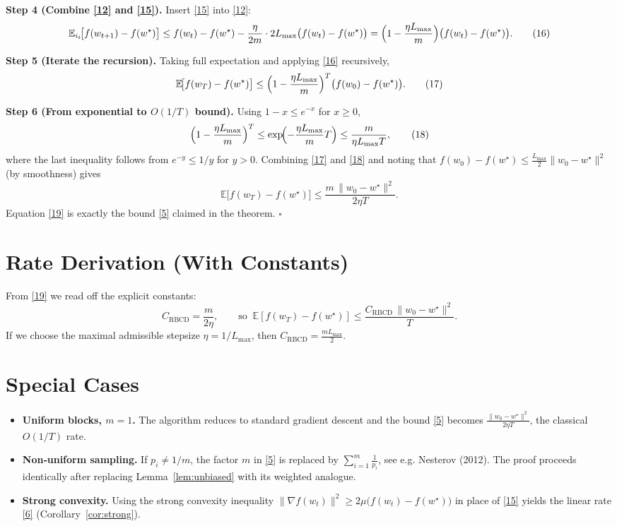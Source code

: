 \documentclass{article}
\newcommand{\E}{\mathbb{E}}
\begin{document}
\noindent\textbf{Step 4 (Combine \eqref{12} and \eqref{15}).}  
Insert \eqref{15} into \eqref{12}:
\[
\E_{i_t}\!\bigl[f(w_{t+1})-f(w^{\star})\bigr]
\le f(w_t)-f(w^{\star})-\frac{\eta}{2m}\cdot
2L_{\max}\bigl(f(w_t)-f(w^{\star})\bigr)
= \Bigl(1-\frac{\eta L_{\max}}{m}\Bigr)
\bigl(f(w_t)-f(w^{\star})\bigr).
\tag{16}
\]

\noindent\textbf{Step 5 (Iterate the recursion).}  
Taking full expectation and applying \eqref{16} recursively,
\[
\E\!\bigl[f(w_T)-f(w^{\star})\bigr]
\le \Bigl(1-\frac{\eta L_{\max}}{m}\Bigr)^{T}
\bigl(f(w_0)-f(w^{\star})\bigr).
\tag{17}
\]

\noindent\textbf{Step 6 (From exponential to $O(1/T)$ bound).}  
Using $1-x\le e^{-x}$ for $x\ge0$,
\[
\Bigl(1-\frac{\eta L_{\max}}{m}\Bigr)^{T}
\le \exp\!\Bigl(-\frac{\eta L_{\max}}{m}T\Bigr)
\le \frac{m}{\eta L_{\max}T},
\tag{18}
\]
where the last inequality follows from $e^{-y}\le 1/y$ for $y>0$.
Combining \eqref{17} and \eqref{18} and noting that
$f(w_0)-f(w^{\star})\le \frac{L_{\max}}{2}\|w_0-w^{\star}\|^{2}$
(by smoothness) gives
\[
\E\!\bigl[f(w_T)-f(w^{\star})\bigr]
\le \frac{m\,\|w_0-w^{\star}\|^{2}}{2\eta T}.
\tag{19}
\]
Equation \eqref{19} is exactly the bound \eqref{5} claimed in the theorem.
\hfill $\square$

\section*{Rate Derivation (With Constants)}
From \eqref{19} we read off the explicit constants:
\[
C_{\text{RBCD}}=\frac{m}{2\eta},\qquad
\text{so}\;\; \E[f(w_T)-f(w^{\star})]\le
\frac{C_{\text{RBCD}}\,\|w_0-w^{\star}\|^{2}}{T}.
\]
If we choose the maximal admissible stepsize
$\eta=1/L_{\max}$, then $C_{\text{RBCD}}= \frac{mL_{\max}}{2}$.

\section*{Special Cases}
\begin{itemize}[leftmargin=*]
\item \textbf{Uniform blocks, $m=1$.}  The algorithm reduces to standard
  gradient descent and the bound \eqref{5} becomes
  $\frac{\|w_0-w^{\star}\|^{2}}{2\eta T}$, the classical $O(1/T)$ rate.
\item \textbf{Non‑uniform sampling.}  If $p_i\neq 1/m$, the factor $m$
  in \eqref{5} is replaced by $\sum_{i=1}^{m}\frac{1}{p_i}$,
  see e.g. Nesterov (2012). The proof proceeds identically after
  replacing Lemma~\ref{lem:unbiased} with its weighted analogue.
\item \textbf{Strong convexity.}  Using the strong convexity inequality
  $\|\nabla f(w_t)\|^{2}\ge 2\mu\bigl(f(w_t)-f(w^{\star})\bigr)$ in place of
  \eqref{15} yields the linear rate \eqref{6} (Corollary~\ref{cor:strong}).
\end{itemize}
\end{document}
